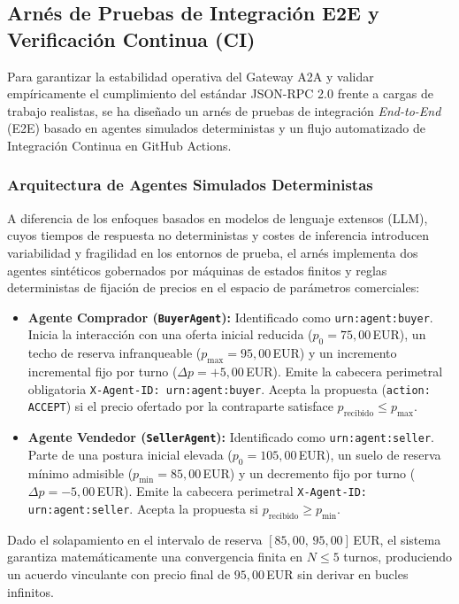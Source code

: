 \subsection{Arnés de Pruebas de Integración E2E y Verificación Continua (CI)}
\label{sec:e2e_testing_ci}
Para garantizar la estabilidad operativa del Gateway A2A y validar empíricamente el cumplimiento del estándar JSON-RPC 2.0 frente a cargas de trabajo realistas, se ha diseñado un arnés de pruebas de integración \textit{End-to-End} (E2E) basado en agentes simulados deterministas y un flujo automatizado de Integración Continua en GitHub Actions.

\subsubsection{Arquitectura de Agentes Simulados Deterministas}
A diferencia de los enfoques basados en modelos de lenguaje extensos (LLM), cuyos tiempos de respuesta no deterministas y costes de inferencia introducen variabilidad y fragilidad en los entornos de prueba, el arnés implementa dos agentes sintéticos gobernados por máquinas de estados finitos y reglas deterministas de fijación de precios en el espacio de parámetros comerciales:
\begin{itemize}
    \item \textbf{Agente Comprador (\texttt{BuyerAgent}):} Identificado como \texttt{urn:agent:buyer}. Inicia la interacción con una oferta inicial reducida ($p_0 = 75{,}00$\,EUR), un techo de reserva infranqueable ($p_{\text{max}} = 95{,}00$\,EUR) y un incremento incremental fijo por turno ($\Delta p = +5{,}00$\,EUR). Emite la cabecera perimetral obligatoria \texttt{X-Agent-ID: urn:agent:buyer}. Acepta la propuesta (\texttt{action: ACCEPT}) si el precio ofertado por la contraparte satisface $p_{\text{recibido}} \le p_{\text{max}}$.
    \item \textbf{Agente Vendedor (\texttt{SellerAgent}):} Identificado como \texttt{urn:agent:seller}. Parte de una postura inicial elevada ($p_0 = 105{,}00$\,EUR), un suelo de reserva mínimo admisible ($p_{\text{min}} = 85{,}00$\,EUR) y un decremento fijo por turno ($\Delta p = -5{,}00$\,EUR). Emite la cabecera perimetral \texttt{X-Agent-ID: urn:agent:seller}. Acepta la propuesta si $p_{\text{recibido}} \ge p_{\text{min}}$.
\end{itemize}

Dado el solapamiento en el intervalo de reserva $[85{,}00,\, 95{,}00]$\,EUR, el sistema garantiza matemáticamente una convergencia finita en $N \le 5$ turnos, produciendo un acuerdo vinculante con precio final de $95{,}00$\,EUR sin derivar en bucles infinitos.

